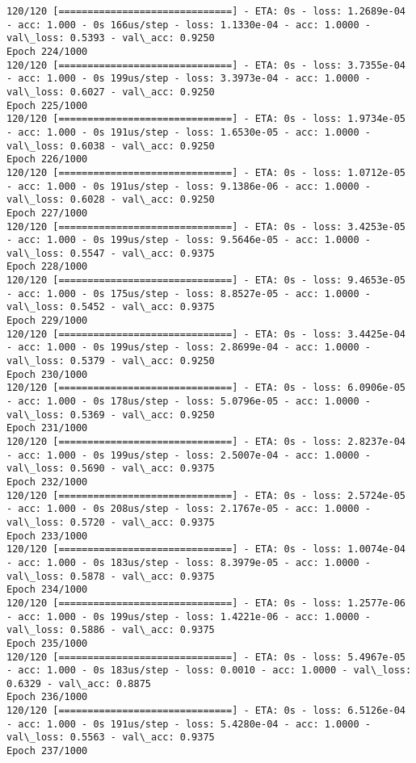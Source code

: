 \documentclass[11pt]{article}
\begin{document}
\begin{Verbatim}[commandchars=\\\{\}]
120/120 [==============================] - ETA: 0s - loss: 1.2689e-04 - acc: 1.000 - 0s 166us/step - loss: 1.1330e-04 - acc: 1.0000 - val\_loss: 0.5393 - val\_acc: 0.9250
Epoch 224/1000
120/120 [==============================] - ETA: 0s - loss: 3.7355e-04 - acc: 1.000 - 0s 199us/step - loss: 3.3973e-04 - acc: 1.0000 - val\_loss: 0.6027 - val\_acc: 0.9250
Epoch 225/1000
120/120 [==============================] - ETA: 0s - loss: 1.9734e-05 - acc: 1.000 - 0s 191us/step - loss: 1.6530e-05 - acc: 1.0000 - val\_loss: 0.6038 - val\_acc: 0.9250
Epoch 226/1000
120/120 [==============================] - ETA: 0s - loss: 1.0712e-05 - acc: 1.000 - 0s 191us/step - loss: 9.1386e-06 - acc: 1.0000 - val\_loss: 0.6028 - val\_acc: 0.9250
Epoch 227/1000
120/120 [==============================] - ETA: 0s - loss: 3.4253e-05 - acc: 1.000 - 0s 199us/step - loss: 9.5646e-05 - acc: 1.0000 - val\_loss: 0.5547 - val\_acc: 0.9375
Epoch 228/1000
120/120 [==============================] - ETA: 0s - loss: 9.4653e-05 - acc: 1.000 - 0s 175us/step - loss: 8.8527e-05 - acc: 1.0000 - val\_loss: 0.5452 - val\_acc: 0.9375
Epoch 229/1000
120/120 [==============================] - ETA: 0s - loss: 3.4425e-04 - acc: 1.000 - 0s 199us/step - loss: 2.8699e-04 - acc: 1.0000 - val\_loss: 0.5379 - val\_acc: 0.9250
Epoch 230/1000
120/120 [==============================] - ETA: 0s - loss: 6.0906e-05 - acc: 1.000 - 0s 178us/step - loss: 5.0796e-05 - acc: 1.0000 - val\_loss: 0.5369 - val\_acc: 0.9250
Epoch 231/1000
120/120 [==============================] - ETA: 0s - loss: 2.8237e-04 - acc: 1.000 - 0s 199us/step - loss: 2.5007e-04 - acc: 1.0000 - val\_loss: 0.5690 - val\_acc: 0.9375
Epoch 232/1000
120/120 [==============================] - ETA: 0s - loss: 2.5724e-05 - acc: 1.000 - 0s 208us/step - loss: 2.1767e-05 - acc: 1.0000 - val\_loss: 0.5720 - val\_acc: 0.9375
Epoch 233/1000
120/120 [==============================] - ETA: 0s - loss: 1.0074e-04 - acc: 1.000 - 0s 183us/step - loss: 8.3979e-05 - acc: 1.0000 - val\_loss: 0.5878 - val\_acc: 0.9375
Epoch 234/1000
120/120 [==============================] - ETA: 0s - loss: 1.2577e-06 - acc: 1.000 - 0s 199us/step - loss: 1.4221e-06 - acc: 1.0000 - val\_loss: 0.5886 - val\_acc: 0.9375
Epoch 235/1000
120/120 [==============================] - ETA: 0s - loss: 5.4967e-05 - acc: 1.000 - 0s 183us/step - loss: 0.0010 - acc: 1.0000 - val\_loss: 0.6329 - val\_acc: 0.8875
Epoch 236/1000
120/120 [==============================] - ETA: 0s - loss: 6.5126e-04 - acc: 1.000 - 0s 191us/step - loss: 5.4280e-04 - acc: 1.0000 - val\_loss: 0.5563 - val\_acc: 0.9375
Epoch 237/1000

\end{Verbatim}
\end{document}
